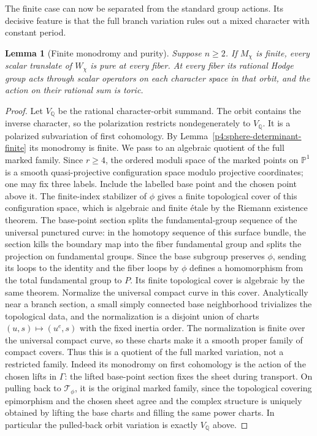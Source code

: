 \documentclass[11pt]{article}
\newcommand{\Q}{\mathbb Q}
\theoremstyle{plain}
\newtheorem{lemma}[theorem]{Lemma}
\theoremstyle{definition}
\theoremstyle{remark}
\numberwithin{equation}{section}
\begin{document}
The finite case can now be separated from the standard group actions.
Its decisive feature is that the full branch variation rules out a
mixed character with constant period.

\begin{lemma}[Finite monodromy and purity]\label{p4:sphere-finite-pure}
Suppose $n\ge2$.  If $M_\chi$ is finite, every scalar translate of
$W_\chi$ is pure at every fiber.  At every fiber its rational Hodge
group acts through scalar operators on each character space in that
orbit, and the action on their rational sum is toric.
\end{lemma}

\begin{proof}
Let $V_\Q$ be the rational character-orbit summand.  The orbit contains
the inverse character, so the polarization restricts nondegenerately
to $V_\Q$.  It is a polarized subvariation of first cohomology.
By Lemma~\ref{p4:sphere-determinant-finite} its monodromy is finite.
We pass to an algebraic quotient of the full marked family.
Since $r\ge4$, the ordered moduli space of the marked points on
$\mathbb P^1$ is a smooth quasi-projective configuration space modulo
projective coordinates; one may fix three labels.  Include the labelled
base point and the chosen point above it.  The finite-index stabilizer
of $\phi$ gives a finite topological cover of this configuration
space, which is algebraic and finite \'etale by the Riemann existence
theorem.  The base-point section splits the fundamental-group sequence
of the universal punctured curve: in the homotopy sequence of this
surface bundle, the section kills the boundary map into the fiber
fundamental group and splits the projection on fundamental groups.
Since the base subgroup preserves
$\phi$, sending its loops to the identity and the fiber loops by
$\phi$ defines a homomorphism from the total fundamental group to $P$.
Its finite topological cover is algebraic by the same theorem.
Normalize the universal compact curve in this cover.  Analytically
near a branch section, a small simply connected base neighborhood
trivializes the topological data, and the normalization is a disjoint
union of charts $(u,s)\mapsto(u^e,s)$ with the fixed inertia order.
The normalization is finite over the universal compact curve, so these
charts make it a smooth proper family of compact covers.  Thus this
is a quotient of the full marked variation, not a restricted family.
Indeed its monodromy on first cohomology is the action of the chosen
lifts in $\Gamma$: the lifted base-point section fixes the sheet during
transport.  On pulling back to $\mathcal T_\phi$, it is the original
marked family, since the topological covering epimorphism and the
chosen sheet agree and the complex structure is uniquely obtained by
lifting the base charts and filling the same power charts.  In
particular the pulled-back orbit variation is exactly $V_\Q$ above.


\end{proof}
\end{document}
